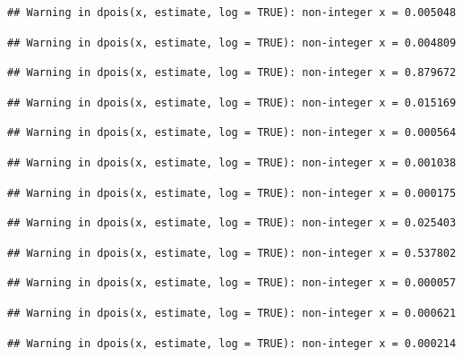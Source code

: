 \documentclass[]{article}
\begin{document}
\begin{verbatim}
## Warning in dpois(x, estimate, log = TRUE): non-integer x = 0.005048
\end{verbatim}

\begin{verbatim}
## Warning in dpois(x, estimate, log = TRUE): non-integer x = 0.004809
\end{verbatim}

\begin{verbatim}
## Warning in dpois(x, estimate, log = TRUE): non-integer x = 0.879672
\end{verbatim}

\begin{verbatim}
## Warning in dpois(x, estimate, log = TRUE): non-integer x = 0.015169
\end{verbatim}

\begin{verbatim}
## Warning in dpois(x, estimate, log = TRUE): non-integer x = 0.000564
\end{verbatim}

\begin{verbatim}
## Warning in dpois(x, estimate, log = TRUE): non-integer x = 0.001038
\end{verbatim}

\begin{verbatim}
## Warning in dpois(x, estimate, log = TRUE): non-integer x = 0.000175
\end{verbatim}

\begin{verbatim}
## Warning in dpois(x, estimate, log = TRUE): non-integer x = 0.025403
\end{verbatim}

\begin{verbatim}
## Warning in dpois(x, estimate, log = TRUE): non-integer x = 0.537802
\end{verbatim}

\begin{verbatim}
## Warning in dpois(x, estimate, log = TRUE): non-integer x = 0.000057
\end{verbatim}

\begin{verbatim}
## Warning in dpois(x, estimate, log = TRUE): non-integer x = 0.000621
\end{verbatim}

\begin{verbatim}
## Warning in dpois(x, estimate, log = TRUE): non-integer x = 0.000214
\end{verbatim}
\end{document}
